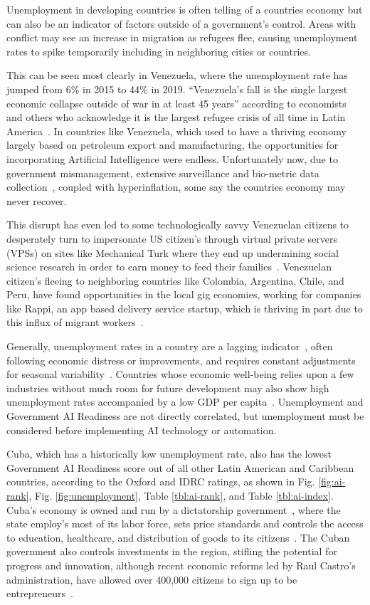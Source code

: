 \documentclass[conference]{IEEEtran}
\begin{document}
Unemployment in developing countries is often telling of a countries economy but can also be an indicator of factors outside of a government's control. Areas with conflict may see an increase in migration as refugees flee, causing unemployment rates to spike temporarily including in neighboring cities or countries.

This can be seen most clearly in Venezuela, where the unemployment rate has jumped from 6\% in 2015 to 44\% in 2019. ``Venezuela's fall is the single largest economic collapse outside of war in at least 45 years'' according to economists and others who acknowledge it is the largest refugee crisis of all time in Latin America~\cite{kurmanaev2019venezuela}. In countries like Venezuela, which used to have a thriving economy largely based on petroleum export and manufacturing, the opportunities for incorporating Artificial Intelligence were endless. Unfortunately now, due to government mismanagement, extensive surveillance and bio-metric data collection~\cite{berwick2018how}, coupled with hyperinflation, some say the countries economy may never recover.

This disrupt has even led to some technologically savvy Venezuelan citizens to desperately turn to impersonate US citizen's through virtual private servers (VPSs) on sites like Mechanical Turk where they end up undermining social science research in order to earn money to feed their families~\cite{kennedy2018venezuela}. Venezuelan citizen's fleeing to neighboring countries like Colombia, Argentina, Chile, and Peru, have found opportunities in the local gig economies, working for companies like Rappi, an app based delivery service startup, which is thriving in part due to this influx of migrant workers~\cite{wyss2019how}. 

Generally, unemployment rates in a country are a lagging indicator~\cite{cain1979unemployment}, often following economic distress or improvements, and requires constant adjustments for seasonal variability~\cite{haynes1996unemployment}. Countries whose economic well-being relies upon a few industries without much room for future development may also show high unemployment rates accompanied by a low GDP per capita~\cite{frenkel2006unemployment}. Unemployment and Government AI Readiness are not directly correlated, but unemployment must be considered before implementing AI technology or automation.

Cuba, which has a historically low unemployment rate, also has the lowest Government AI Readiness score out of all other Latin American and Caribbean countries, according to the Oxford and IDRC ratings, as shown in Fig. \ref{fig:ai-rank}, Fig. \ref{fig:unemployment}, Table \ref{tbl:ai-rank}, and Table \ref{tbl:ai-index}. Cuba's economy is owned and run by a dictatorship government~\cite{horowitz2004transition}, where the state employ's most of its labor force, sets price standards and controls the access to education, healthcare, and distribution of goods to its citizens~\cite{smith2016understanding}. The Cuban government also controls investments in the region, stifling the potential for progress and innovation, although recent economic reforms led by Raul Castro's administration, have allowed over 400,000 citizens to sign up to be entrepreneurs~\cite{feinberg2012new}.
\end{document}
